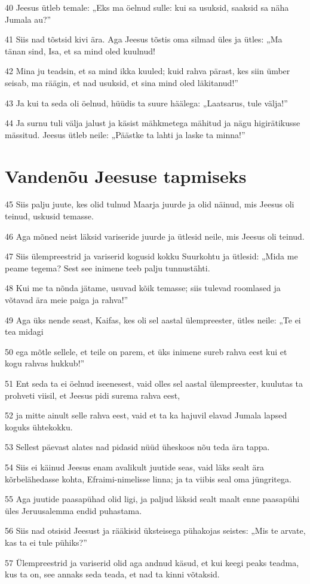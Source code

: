 \par 40 Jeesus ütleb temale: „Eks ma öelnud sulle: kui sa usuksid, saaksid sa näha Jumala au?”
\par 41 Siis nad tõstsid kivi ära. Aga Jeesus tõstis oma silmad üles ja ütles: „Ma tänan sind, Isa, et sa mind oled kuulnud!
\par 42 Mina ju teadsin, et sa mind ikka kuuled; kuid rahva pärast, kes siin ümber seisab, ma räägin, et nad usuksid, et sina mind oled läkitanud!”
\par 43 Ja kui ta seda oli öelnud, hüüdis ta suure häälega: „Laatsarus, tule välja!”
\par 44 Ja surnu tuli välja jalust ja käsist mähkmetega mähitud ja nägu higirätikusse mässitud. Jeesus ütleb neile: „Päästke ta lahti ja laske ta minna!”

\section*{Vandenõu Jeesuse tapmiseks}

\par 45 Siis palju juute, kes olid tulnud Maarja juurde ja olid näinud, mis Jeesus oli teinud, uskusid temasse.
\par 46 Aga mõned neist läksid variseride juurde ja ütlesid neile, mis Jeesus oli teinud.
\par 47 Siis ülempreestrid ja variserid kogusid kokku Suurkohtu ja ütlesid: „Mida me peame tegema? Sest see inimene teeb palju tunnustähti.
\par 48 Kui me ta nõnda jätame, usuvad kõik temasse; siis tulevad roomlased ja võtavad ära meie paiga ja rahva!”
\par 49 Aga üks nende seast, Kaifas, kes oli sel aastal ülempreester, ütles neile: „Te ei tea midagi
\par 50 ega mõtle sellele, et teile on parem, et üks inimene sureb rahva eest kui et kogu rahvas hukkub!”
\par 51 Ent seda ta ei öelnud iseenesest, vaid olles sel aastal ülempreester, kuulutas ta prohveti viisil, et Jeesus pidi surema rahva eest,
\par 52 ja mitte ainult selle rahva eest, vaid et ta ka hajuvil elavad Jumala lapsed koguks ühtekokku.
\par 53 Sellest päevast alates nad pidasid nüüd üheskoos nõu teda ära tappa.
\par 54 Siis ei käinud Jeesus enam avalikult juutide seas, vaid läks sealt ära kõrbelähedasse kohta, Efraimi-nimelisse linna; ja ta viibis seal oma jüngritega.
\par 55 Aga juutide paasapühad olid ligi, ja paljud läksid sealt maalt enne paasapühi üles Jeruusalemma endid puhastama.
\par 56 Siis nad otsisid Jeesust ja rääkisid üksteisega pühakojas seistes: „Mis te arvate, kas ta ei tule pühiks?”
\par 57 Ülempreestrid ja variserid olid aga andnud käsud, et kui keegi peaks teadma, kus ta on, see annaks seda teada, et nad ta kinni võtaksid.


